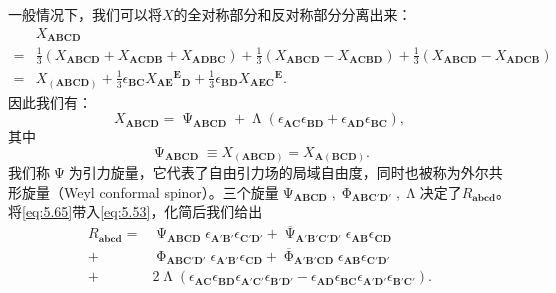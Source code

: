一般情况下，我们可以将$X$的全对称部分和反对称部分分离出来：
\begin{equation*}
	\begin{aligned}
		& X_{\boldsymbol{ABCD}}\\
		= & \frac{1}{3} (X_{\boldsymbol{ABCD}} +X_{\boldsymbol{ACDB}} +X_{\boldsymbol{ADBC}} )+\frac{1}{3} (X_{\boldsymbol{ABCD}} -X_{\boldsymbol{ACBD}} )+\frac{1}{3}( X_{\boldsymbol{ABCD}} -X_{\boldsymbol{ADCB}})\\
		= & X_{(\boldsymbol{ABCD})} +\frac{1}{3} \epsilon _{\boldsymbol{BC}} X{_{\boldsymbol{AE}}}^{\boldsymbol{E}}{}_{\boldsymbol{D}} +\frac{1}{3} \epsilon _{\boldsymbol{BD}} X{_{\boldsymbol{AEC}}}^{\boldsymbol{E}} .
	\end{aligned}
\end{equation*}
因此我们有：
\begin{equation}
	X_{\boldsymbol{ABCD}} =\upPsi _{\boldsymbol{ABCD}} +\upLambda (\epsilon _{\boldsymbol{AC}} \epsilon _{\boldsymbol{BD}} +\epsilon _{\boldsymbol{AD}} \epsilon _{\boldsymbol{BC}} ),
	\label{eq:5.65}
\end{equation}
其中
\begin{equation*}
	\upPsi _{\boldsymbol{ABCD}} \equiv X_{(\boldsymbol{ABCD})} =X_{\boldsymbol{A}(\boldsymbol{BCD})} .
\end{equation*}
我们称$\upPsi $为引力旋量，它代表了自由引力场的局域自由度，同时也被称为外尔共形旋量（Weyl conformal spinor）。三个旋量$\upPsi _{\boldsymbol{ABCD}} ,\upPhi _{\boldsymbol{ABC} '\boldsymbol{D} '} ,\upLambda $决定了$R_{\boldsymbol{abcd}}$。将\ref{eq:5.65}带入\ref{eq:5.53}，化简后我们给出
\begin{equation*}
	\begin{aligned}
		R_{\boldsymbol{abcd}} = & \upPsi _{\boldsymbol{ABCD}} \epsilon _{\boldsymbol{A} '\boldsymbol{B} '} \epsilon _{\boldsymbol{C} '\boldsymbol{D} '} +\overline{\upPsi }_{\boldsymbol{A} '\boldsymbol{B} '\boldsymbol{C} '\boldsymbol{D} '} \epsilon _{\boldsymbol{AB}} \epsilon _{\boldsymbol{CD}}\\
		+ & \upPhi _{\boldsymbol{ABC} '\boldsymbol{D} '} \epsilon _{\boldsymbol{A} '\boldsymbol{B} '} \epsilon _{\boldsymbol{CD}} +\overline{\upPhi }_{\boldsymbol{A} '\boldsymbol{B} '\boldsymbol{CD}} \epsilon _{\boldsymbol{AB}} \epsilon _{\boldsymbol{C} '\boldsymbol{D} '}\\
		+ & 2\upLambda ( \epsilon _{\boldsymbol{AC}} \epsilon _{\boldsymbol{BD}} \epsilon _{\boldsymbol{A} '\boldsymbol{C} '} \epsilon _{\boldsymbol{B} '\boldsymbol{D} '} -\epsilon _{\boldsymbol{AD}} \epsilon _{\boldsymbol{BC}} \epsilon _{\boldsymbol{A} '\boldsymbol{D} '} \epsilon _{\boldsymbol{B} '\boldsymbol{C} '}) .
	\end{aligned}
\end{equation*}
